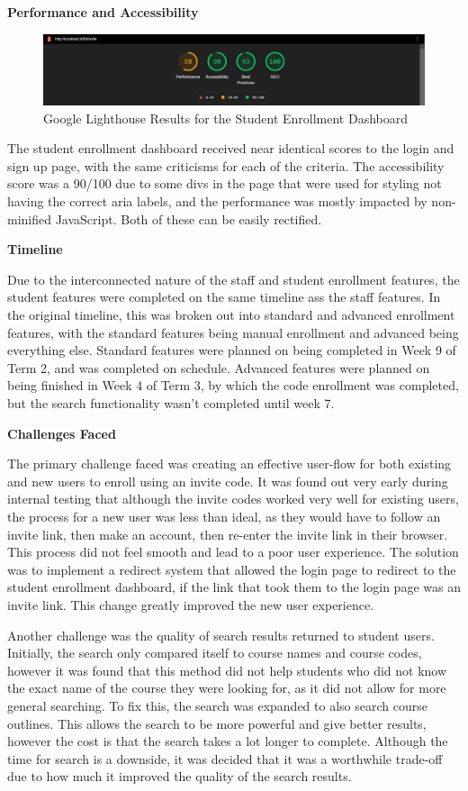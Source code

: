 \textbf{Performance and Accessibility}

\begin{figure}[h!]
    \centering
    \includegraphics[scale=0.3]{images/accounts-student-lighthouse.jpg}
    \caption{Google Lighthouse Results for the Student Enrollment Dashboard}
\end{figure}
The student enrollment dashboard received near identical scores to the login and sign up page, with the same criticisms for each of the criteria. The accessibility score was a 90/100 due to some divs in the page that were used for styling not having the correct aria labels, and the performance was mostly impacted by non-minified JavaScript. Both of these can be easily rectified.

\textbf{Timeline}

Due to the interconnected nature of the staff and student enrollment features, the student features were completed on the same timeline ass the staff features. In the original timeline, this was broken out into standard and advanced enrollment features, with the standard features being manual enrollment and advanced being everything else. Standard features were planned on being completed in Week 9 of Term 2, and was completed on schedule. Advanced features were planned on being finished in Week 4 of Term 3, by which the code enrollment was completed, but the search functionality wasn't completed until week 7.

\textbf{Challenges Faced}

The primary challenge faced was creating an effective user-flow for both existing and new users to enroll using an invite code. It was found out very early during internal testing that although the invite codes worked very well for existing users, the process for a new user was less than ideal, as they would have to follow an invite link, then make an account, then re-enter the invite link in their browser. This process did not feel smooth and lead to a poor user experience. The solution was to implement a redirect system that allowed the login page to redirect to the student enrollment dashboard, if the link that took them to the login page was an invite link. This change greatly improved the new user experience.

Another challenge was the quality of search results returned to student users. Initially, the search only compared itself to course names and course codes, however it was found that this method did not help students who did not know the exact name of the course they were looking for, as it did not allow for more general searching. To fix this, the search was expanded to also search course outlines. This allows the search to be more powerful and give better results, however the cost is that the search takes a lot longer to complete. Although the time for search is a downside, it was decided that it was a worthwhile trade-off due to how much it improved the quality of the search results.